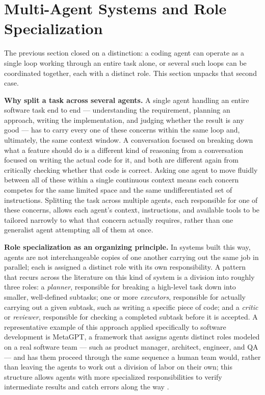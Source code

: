 \section{Multi-Agent Systems and Role Specialization}

The previous section closed on a distinction: a coding agent can operate as a single loop working through an entire task alone, or several such loops can be coordinated together, each with a distinct role. This section unpacks that second case.

\textbf{Why split a task across several agents.} A single agent handling an entire software task end to end --- understanding the requirement, planning an approach, writing the implementation, and judging whether the result is any good --- has to carry every one of these concerns within the same loop and, ultimately, the same context window. A conversation focused on breaking down what a feature should do is a different kind of reasoning from a conversation focused on writing the actual code for it, and both are different again from critically checking whether that code is correct. Asking one agent to move fluidly between all of these within a single continuous context means each concern competes for the same limited space and the same undifferentiated set of instructions. Splitting the task across multiple agents, each responsible for one of these concerns, allows each agent's context, instructions, and available tools to be tailored narrowly to what that concern actually requires, rather than one generalist agent attempting all of them at once.

\textbf{Role specialization as an organizing principle.} In systems built this way, agents are not interchangeable copies of one another carrying out the same job in parallel; each is assigned a distinct role with its own responsibility. A pattern that recurs across the literature on this kind of system is a division into roughly three roles: a \textit{planner}, responsible for breaking a high-level task down into smaller, well-defined subtasks; one or more \textit{executors}, responsible for actually carrying out a given subtask, such as writing a specific piece of code; and a \textit{critic} or \textit{reviewer}, responsible for checking a completed subtask before it is accepted. A representative example of this approach applied specifically to software development is MetaGPT, a framework that assigns agents distinct roles modeled on a real software team --- such as product manager, architect, engineer, and QA --- and has them proceed through the same sequence a human team would, rather than leaving the agents to work out a division of labor on their own; this structure allows agents with more specialized responsibilities to verify intermediate results and catch errors along the way \cite{hong2024metagpt}.

